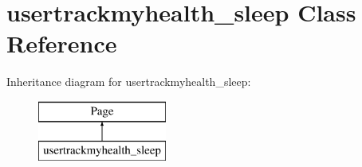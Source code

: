\hypertarget{classusertrackmyhealth__sleep}{\section{usertrackmyhealth\-\_\-sleep Class Reference}
\label{classusertrackmyhealth__sleep}
}
Inheritance diagram for usertrackmyhealth\-\_\-sleep\-:\begin{figure}[H]
\begin{center}
\leavevmode
\includegraphics[height=2.000000cm]{classusertrackmyhealth__sleep}
\end{center}
\end{figure}
